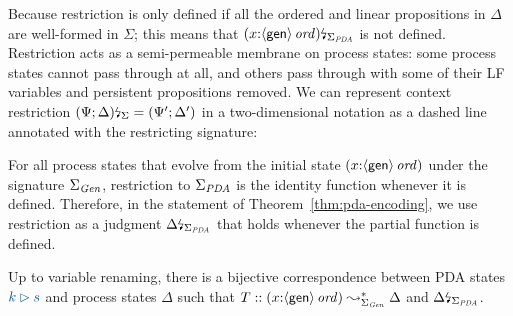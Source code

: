 Because 
restriction is only defined if
all the ordered and linear propositions in $\Delta$ are well-formed
in $\Sigma$; this means that ${(x{:}{\langle {\sf
      gen} \rangle}\,{{\it ord}})}{\mbox{\lightning}}_{\Sigma_{\it PDA}}$ is not defined.
Restriction acts as a semi-permeable membrane on process states: some
process states cannot pass through at all, and others pass through
with some of their LF variables and persistent propositions
removed. We can represent context restriction ${(\Psi;
  \Delta)}{\mbox{\lightning}}_{\Sigma} = (\Psi'; \Delta')$ in a two-dimensional notation
as a dashed line annotated with the restricting signature:
\begin{center}
\end{center}

For all process states that evolve from the initial state
$(x{:}{\langle {\sf gen} \rangle}\,{{\it ord}})$ under the signature $\Sigma_{\it
  Gen}$, restriction to $\Sigma_{\it PDA}$ is the identity function
whenever it is defined. Therefore, in the statement of
Theorem~\ref{thm:pda-encoding}, we use restriction as a judgment
${\Delta}{\mbox{\lightning}}_{\Sigma_{\it PDA}}$ that holds whenever the partial 
function is defined.

\bigskip
\begin{theorem}[Encoding]\label{thm:pda-encoding}
  Up to variable renaming, there is a bijective correspondence between
  PDA states $\obj{k \rhd s}$ and process states $\Delta$ such that
  $T :: (x{:}{\langle {\sf gen} \rangle}\,{{\it ord}}) \leadsto^*_{\Sigma_{\it Gen}}
  \Delta$ and ${\Delta}{\mbox{\lightning}}_{\Sigma_{\it
      PDA}}$.
\end{theorem}

